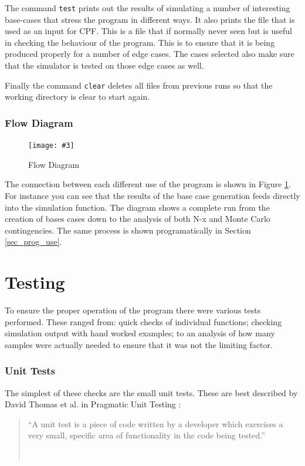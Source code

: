 \documentclass[a4paper,oneside,12pt]{report}
\newcommand{\image}[3] {
  \begin{figure}
    \begin{center}
      \texttt{[image: \#3]}
      \caption{#2}
      \label{#1}
    \end{center}
  \end{figure}
}
\newcommand{\tmpquotecite}{}%
\newenvironment{myquote}[1][]
{\renewcommand{\tmpquotecite}{#1}\begin{quote}\begin{itshape}``}
{''\end{itshape}~{\normalfont~\tmpquotecite}\end{quote}}
\begin{document}
The command \texttt{test} prints out the results of simulating a number of interesting base-cases that stress the program in different ways. It also prints the file that is used as an input for CPF. This is a file that if normally never seen but is useful in checking the behaviour of the program. This is to ensure that it is being produced properly for a number of edge cases. The cases selected also make sure that the simulator is tested on those edge cases as well.

Finally the command \texttt{clear} deletes all files from previous runs so that the working directory is clear to start again.

\subsubsection{Flow Diagram}

\image{imgflow}{Flow Diagram}{flow.png}

The connection between each different use of the program is shown in Figure \ref{imgflow}. For instance you can see that the results of the base case generation feeds directly into the simulation function. The diagram shows a complete run from the creation of bases cases down to the analysis of both N-x and Monte Carlo contingencies. The same process is shown programatically in Section \ref{sec_prog_use}. 

\section{Testing}

To ensure the proper operation of the program there were various tests performed. These ranged from: quick checks of individual functions; checking simulation output with hand worked examples; to an analysis of how many samples were actually needed to ensure that it was not the limiting factor.

\subsubsection{Unit Tests}

The simplest of these checks are the small unit tests. These are best
described by David Thomas et al. in Pragmatic Unit Testing \cite{Hunt2007}:

\begin{myquote}[\cite{Hunt2007}]A unit test is a piece of code written by a developer which exercises a very small, specific area of functionality in the code being tested.\end{myquote}
\end{document}
